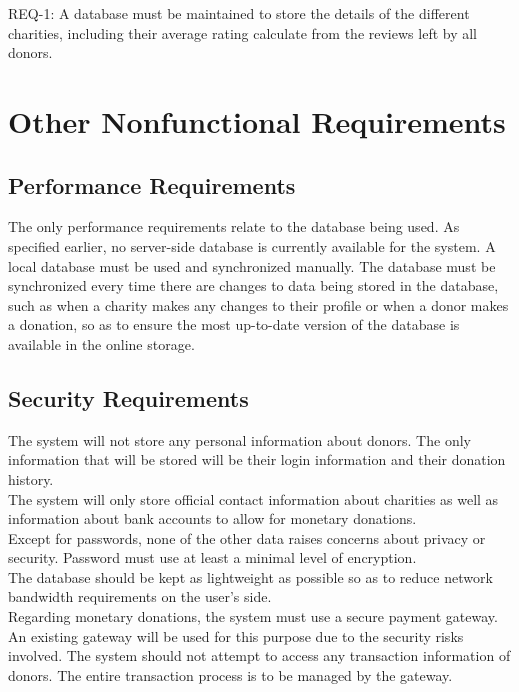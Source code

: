 \documentclass{scrreprt}
\begin{document}
REQ-1:	A database must be maintained to store the details of the different charities, including their average rating calculate from the reviews left by all donors.\\


\chapter{Other Nonfunctional Requirements}

\section{Performance Requirements}

The only performance requirements relate to the database being used. As specified earlier, no server-side database is currently available for the system. A local database must be used and synchronized manually. The database must be synchronized every time there are changes to data being stored in the database, such as when a charity makes any changes to their profile or when a donor makes a donation, so as to ensure the most up-to-date version of the database is available in the online storage.\\

\section{Security Requirements}

The system will not store any personal information about donors. The only information that will be stored will be their login information and their donation history.\\

The system will only store official contact information about charities as well as information about bank accounts to allow for monetary donations.\\

Except for passwords, none of the other data raises concerns about privacy or security. Password must use at least a minimal level of encryption.\\

The database should be kept as lightweight as possible so as to reduce network bandwidth requirements on the user’s side.\\

Regarding monetary donations, the system must use a secure payment gateway. An existing gateway will be used for this purpose due to the security risks involved. The system should not attempt to access any transaction information of donors. The entire transaction process is to be managed by the gateway.\\
\end{document}

